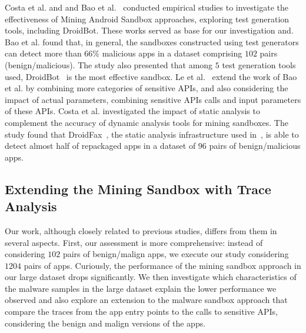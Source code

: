 Costa et al. and and Bao et al.~\cite{DBLP:conf/wcre/BaoLL18,DBLP:conf/scam/CostaMCMVBC20} conducted empirical studies to investigate the effectiveness of Mining Android Sandbox
approaches, exploring test generation tools, including DroidBot. These works served as base for our investigation and. Bao et al. found that, in general, the sandboxes constructed using test generators can detect more than $66$\% malicious apps in a dataset comprising $102$ pairs (benign/malicious). The study also presented that among $5$ test generation tools used, DroidBot~\cite{DBLP:conf/icse/LiYGC17} is the most effective sandbox.
Le et al.~\cite{le2018towards} extend the work of Bao et al. by combining more categories of sensitive APIs, and also considering the impact of actual parameters, combining sensitive APIs calls and input parameters of these APIs.
Costa et al.\cite{DBLP:journals/jss/CostaMMSSBNR22} investigated the impact of static analysis to complement the accuracy of dynamic analysis tools for mining sandboxes. The study found that DroidFax~\cite{DBLP:conf/icsm/CaiR17a}, the static analysis infrastructure used in~\cite{DBLP:conf/wcre/BaoLL18}, is able to detect almost half of repackaged apps in a
dataset of $96$ pairs of benign/malicious apps.


\subsection{Extending the Mining Sandbox with Trace Analysis}

Our work, although closely related to previous studies, differs from them in several aspects.  First, our assessment is more comprehensive: instead of considering $102$ pairs of benign/malign apps, we execute our study considering $1204$ pairs of apps. Curiously, the performance of the mining sandbox approach in our large dataset drops significantly. We then investigate which characteristics of the malware samples in the large dataset explain the lower performance we observed and also explore an extension to the malware sandbox approach that compare the traces from the app entry points to the calls to sensitive APIs, considering the benign and malign versions of the apps. 

